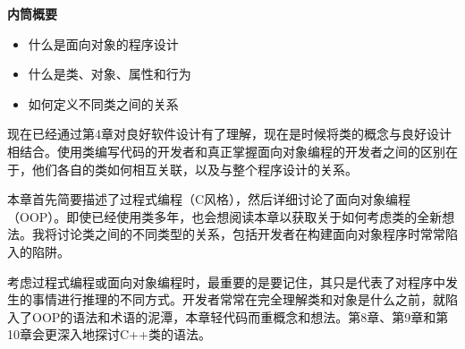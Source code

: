 \noindent
\textbf{内筒概要}

\begin{itemize}
\item
什么是面向对象的程序设计

\item
什么是类、对象、属性和行为

\item
如何定义不同类之间的关系
\end{itemize}

现在已经通过第4章对良好软件设计有了理解，现在是时候将类的概念与良好设计相结合。使用类编写代码的开发者和真正掌握面向对象编程的开发者之间的区别在于，他们各自的类如何相互关联，以及与整个程序设计的关系。

本章首先简要描述了过程式编程（C风格），然后详细讨论了面向对象编程（OOP）。即使已经使用类多年，也会想阅读本章以获取关于如何考虑类的全新想法。我将讨论类之间的不同类型的关系，包括开发者在构建面向对象程序时常常陷入的陷阱。

考虑过程式编程或面向对象编程时，最重要的是要记住，其只是代表了对程序中发生的事情进行推理的不同方式。开发者常常在完全理解类和对象是什么之前，就陷入了OOP的语法和术语的泥潭，本章轻代码而重概念和想法。第8章、第9章和第10章会更深入地探讨C++类的语法。















